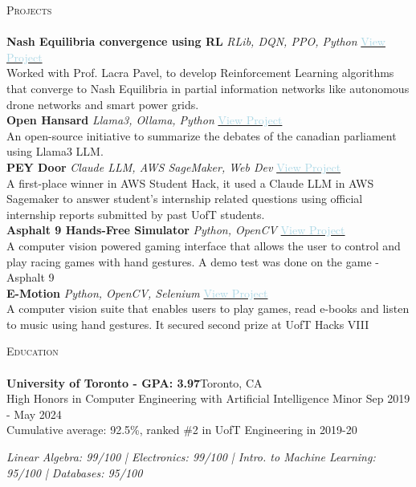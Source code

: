\documentclass[a4paper]{article}
\newcommand{\lineunder} {
    \vspace*{-8pt} \\
    \hspace*{-18pt} \hrulefill \\
}
\newcommand{\header} [1] {
    {\hspace*{-18pt}\vspace*{6pt} \textsc{#1}}
    \vspace*{-6pt} \lineunder
}
\begin{document}
\header{Projects}
{\textbf{Nash Equilibria convergence using RL}} {\sl RLib, DQN, PPO, Python} \hfill \href{https://github.com/BoundlessDevelopment/Capstone-Project}{\textcolor{lightblue}{View Project}}\\
Worked with Prof. Lacra Pavel, to develop Reinforcement Learning algorithms that converge to Nash Equilibria in partial information networks
 like autonomous drone networks and smart power grids.\\
\vspace*{1mm}
{\textbf{Open Hansard}} {\sl Llama3, Ollama, Python} \hfill \href{https://github.com/pandyah5/open-hansard}{\textcolor{lightblue}{View Project}}\\
An open-source initiative to summarize the debates of the canadian parliament using Llama3 LLM.\\
\vspace*{1mm}
{\textbf{PEY Door}} {\sl Claude LLM, AWS SageMaker, Web Dev} \hfill \href{https://devpost.com/software/peydoor}{\textcolor{lightblue}{View Project}}\\
A first-place winner in AWS Student Hack, it used a Claude LLM in AWS Sagemaker to answer student's internship related questions using official internship reports submitted by past UofT students.\\
\vspace*{1mm}
{\textbf{Asphalt 9 Hands-Free Simulator}} {\sl Python, OpenCV} \hfill \href{https://github.com/pandyah5/asphalt9_OpenCV_Simulation?tab=readme-ov-file}{\textcolor{lightblue}{View Project}} \\
A computer vision powered gaming interface that allows the user to control and play racing games with hand gestures. A demo test was done on the game - Asphalt 9\\
\vspace*{1mm}
{\textbf{E-Motion}} {\sl Python, OpenCV, Selenium} \hfill \href{https://devpost.com/software/e-motion-otbl2i}{\textcolor{lightblue}{View Project}} \\
A computer vision suite that enables users to play games, read e-books and listen to music using hand gestures. It secured second prize at UofT Hacks VIII\\

\vspace{2mm}

\header{Education}
\textbf{University of Toronto - GPA: 3.97}\hfill Toronto, CA\\
High Honors in Computer Engineering with Artificial Intelligence Minor \hfill Sep 2019 - May 2024\\
Cumulative average: 92.5\%, ranked \#2 in UofT Engineering in 2019-20
\linebreak\\
\vspace{-3.5mm}
\begin{footnotesize}
\textit{Linear Algebra: 99/100 | Electronics: 99/100 | 
 Intro. to Machine Learning: 95/100 | Databases: 95/100}
\end{footnotesize}
\vspace{2mm}
\end{document}
